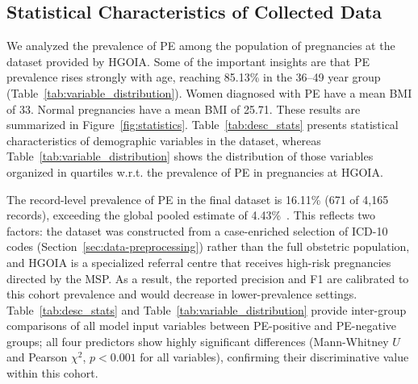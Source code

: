 \documentclass[diagnostics,article,submit,pdftex,moreauthors]{Definitions/mdpi}
\begin{document}
\subsection{Statistical Characteristics of Collected Data}
\label{sec:stat-char-data}
We analyzed the prevalence of \ac{PE} among the population
of pregnancies at the dataset provided by \ac{HGOIA}. Some
of the important insights are that \ac{PE} prevalence rises strongly
with age, reaching 85.13\% in the 36--49 year group
(Table~\ref{tab:variable_distribution}). Women diagnosed
with \ac{PE} have a mean \ac{BMI} of 33. Normal pregnancies
have a mean \ac{BMI} of 25.71. These results are summarized in
Figure~\ref{fig:statistics}. Table~\ref{tab:desc_stats} presents
statistical characteristics of demographic variables in the dataset,
whereas Table~\ref{tab:variable_distribution} shows the distribution
of those variables organized in quartiles \ac{w.r.t.} the
prevalence of \ac{PE} in pregnancies at \ac{HGOIA}.

The record-level prevalence of \ac{PE} in the final
  dataset is 16.11\% (671 of 4,165 records), exceeding the global
  pooled estimate of 4.43\%~\cite{vera2025preeclampsia}. This
  reflects two factors: the dataset was constructed from a
  case-enriched selection of \ac{ICD-10} codes
  (Section~\ref{sec:data-preprocessing}) rather than the full
  obstetric population, and \ac{HGOIA} is a specialized referral
  centre that receives high-risk pregnancies directed by the
  \ac{MSP}. As a result, the reported precision and \ac{F1} are
  calibrated to this cohort prevalence and would decrease in
  lower-prevalence settings. Table~\ref{tab:desc_stats} and
  Table~\ref{tab:variable_distribution} provide inter-group
  comparisons of all model input variables between \ac{PE}-positive
  and \ac{PE}-negative groups; all four predictors show highly
  significant differences (Mann-Whitney $U$ and Pearson
  $\chi^2$, $p < 0.001$ for all variables), confirming their
  discriminative value within this cohort.
\end{document}
